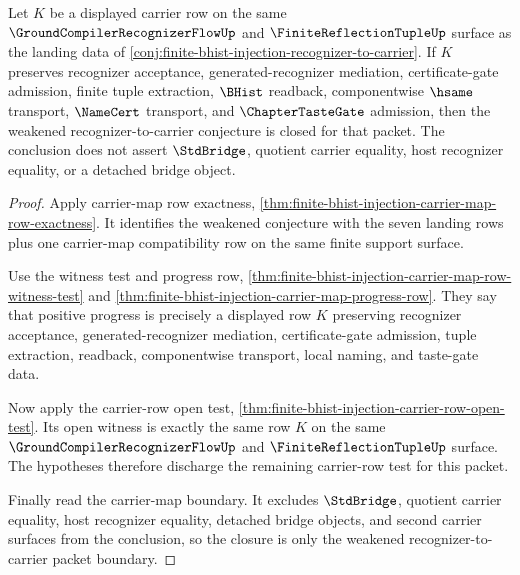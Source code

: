 \begin{theorem}
\label{thm:finite-bhist-injection-carrier-row-discharge-criterion}
Let $K$ be a displayed carrier row on the same $\GroundCompilerRecognizerFlowUp$ and $\FiniteReflectionTupleUp$ surface as the landing data of \autoref{conj:finite-bhist-injection-recognizer-to-carrier}. If $K$ preserves recognizer acceptance, generated-recognizer mediation, certificate-gate admission, finite tuple extraction, $\BHist$ readback, componentwise $\hsame$ transport, $\NameCert$ transport, and $\ChapterTasteGate$ admission, then the weakened recognizer-to-carrier conjecture is closed for that packet. The conclusion does not assert $\StdBridge$, quotient carrier equality, host recognizer equality, or a detached bridge object.
\end{theorem}
\begin{proof}
Apply carrier-map row exactness, \autoref{thm:finite-bhist-injection-carrier-map-row-exactness}. It identifies the weakened conjecture with the seven landing rows plus one carrier-map compatibility row on the same finite support surface.

Use the witness test and progress row, \autoref{thm:finite-bhist-injection-carrier-map-row-witness-test} and \autoref{thm:finite-bhist-injection-carrier-map-progress-row}. They say that positive progress is precisely a displayed row $K$ preserving recognizer acceptance, generated-recognizer mediation, certificate-gate admission, tuple extraction, readback, componentwise transport, local naming, and taste-gate data.

Now apply the carrier-row open test, \autoref{thm:finite-bhist-injection-carrier-row-open-test}. Its open witness is exactly the same row $K$ on the same $\GroundCompilerRecognizerFlowUp$ and $\FiniteReflectionTupleUp$ surface. The hypotheses therefore discharge the remaining carrier-row test for this packet.

Finally read the carrier-map boundary. It excludes $\StdBridge$, quotient carrier equality, host recognizer equality, detached bridge objects, and second carrier surfaces from the conclusion, so the closure is only the weakened recognizer-to-carrier packet boundary.
\end{proof}


